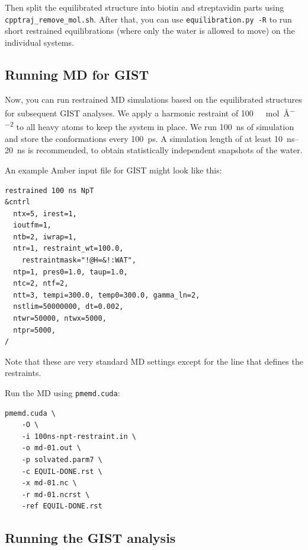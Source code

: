 \documentclass[9pt,tutorial]{livecoms}
\newcommand{\software}{\texttt}
\begin{document}
Then split the equilibrated structure into biotin and streptavidin parts using \software{cpptraj\_remove\_mol.sh}.
After that, you can use \software{equilibration.py -R} to run short restrained equilibrations (where only the water is allowed to move) on the individual systems.

\subsection{Running MD for GIST}

Now, you can run restrained MD simulations based on the equilibrated structures for subsequent GIST analyses.
We apply a harmonic restraint of \SI{100}{\kilo\calorie\per\mole\per\angstrom\squared} to all heavy atoms to keep the system in place.
We run \SI{100}{\nano\second} of simulation and store the conformations every \SI{100}{\pico\second}.
A simulation length of at least \SIrange{10}{20}{\nano\second} is recommended, to obtain statistically independent snapshots of the water.

An example Amber input file for GIST might look like this:
\begin{lstlisting}
restrained 100 ns NpT
&cntrl
  ntx=5, irest=1,
  ioutfm=1,
  ntb=2, iwrap=1,
  ntr=1, restraint_wt=100.0,
    restraintmask="!@H=&!:WAT",
  ntp=1, pres0=1.0, taup=1.0,
  ntc=2, ntf=2,
  ntt=3, tempi=300.0, temp0=300.0, gamma_ln=2,
  nstlim=50000000, dt=0.002,
  ntwr=50000, ntwx=5000,
  ntpr=5000,
/
\end{lstlisting}
Note that these are very standard MD settings except for the line that defines the restraints.

Run the MD using \software{pmemd.cuda}:
\begin{lstlisting}
pmemd.cuda \
	-O \
	-i 100ns-npt-restraint.in \
	-o md-01.out \
	-p solvated.parm7 \
	-c EQUIL-DONE.rst \
	-x md-01.nc \
	-r md-01.ncrst \
	-ref EQUIL-DONE.rst
\end{lstlisting}
\subsection{Running the GIST analysis}
\end{document}
